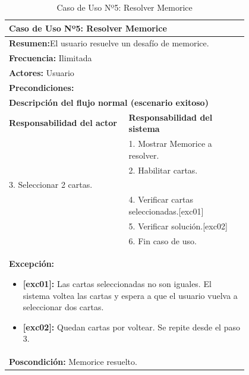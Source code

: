 \begin{table}[H]
    \centering
    \caption{Caso de Uso Nº5: Resolver Memorice}
    
    \begin{tabular}{| p{0.4\linewidth} | p{0.4\linewidth} |}
        \hline
        \multicolumn{2}{|l|}{\textbf{Caso de Uso Nº5:}  Resolver Memorice} \\
        \hline
        \multicolumn{2}{|l|}{\textbf{Resumen:}El usuario resuelve un desafío de memorice.} \\
        \hline
        \multicolumn{2}{|l|}{\textbf{Frecuencia:}  Ilimitada} \\
        \hline
        \multicolumn{2}{|l|}{\textbf{Actores:}  Usuario} \\
        \hline
        \multicolumn{2}{|l|}{\textbf{Precondiciones:}} \\
        \hline
        \multicolumn{2}{|l|}{\textbf{Descripción del flujo normal (escenario exitoso)} } \\
        \hline
        \textbf{Responsabilidad del actor} & \textbf{Responsabilidad del sistema}\\
            & 1. Mostrar Memorice a resolver.\\
            & 2. Habilitar cartas. \\
        3. Seleccionar 2 cartas.&\\
            & 4. Verificar cartas seleccionadas.[exc01]\\
            & 5. Verificar solución.[exc02]\\
            & 6. Fin caso de uso. \\
        \hline
        \multicolumn{2}{|p{0.8\linewidth}|}{
            \textbf{Excepción:}
            \begin{itemize}
                \item \textbf{[exc01]:} Las cartas seleccionadas no son iguales. El sistema voltea las cartas y espera a que el usuario vuelva a seleccionar dos cartas.
                \item \textbf{[exc02]:} Quedan cartas por voltear. Se repite desde el paso 3.
            \end{itemize}}\\
            \hline
        \multicolumn{2}{|l|}{\textbf{Poscondición:}  Memorice resuelto.} \\
        \hline
    \end{tabular}

    \label{table:5}
\end{table}

